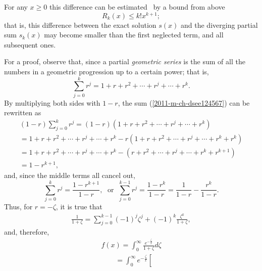For any $x\ge 0$ this difference can be estimated~\cite{rousseau-2004} by  a bound from above
\begin{equation}
  R_k(x)
\le
k! x^{k+1};
\label{2011-m-ch-dseeest}
\end{equation}
that is, this difference between the exact solution $s(x)$ and the diverging partial sum
$s_{k}(x)$ may become smaller than the first neglected term, and all subsequent ones.




{\color{OliveGreen}
\bproof

For a proof, observe that,
since
a partial {\em geometric series}
is the sum of all the numbers in a geometric progression up to a certain power;
that is,
\begin{equation}
\sum_{j=0}^k r^j =   1+r+r^2+ \cdots +r^j+ \cdots +r^k .
\label{2011-m-ch-dsee124567}
\end{equation}
By multiplying both sides with $1-r$,
the sum (\ref{2011-m-ch-dsee124567}) can be rewritten as
\begin{equation}
\begin{split}
(1-r) \sum_{j=0}^k r^j=
(1-r) (1+ r+r^2+ \cdots +r^j+ \cdots +r^k)\\
=1+ r+r^2+ \cdots +r^j+ \cdots +r^k -
r(1+r+r^2+ \cdots +r^j+ \cdots +r^k +r^k) \\
=1+ r+r^2+ \cdots +r^j+ \cdots +r^k -
(r+r^2+ \cdots +r^j+ \cdots +r^k +r^{k+1}) \\
= 1-r^{k+1}
,
\end{split}
\end{equation}
and, since the middle terms all cancel out,
\begin{equation}
\sum_{j=0}^k r^j =  \frac{1-r^{k+1}}{1-r},
\;
\textrm{ or }
\;
\sum_{j=0}^{k-1} r^j =  \frac{1-r^{k}}{1-r}  =  \frac{1}{1-r} - \frac{r^{k}}{1-r}
.
\label{2011-m-ch-dsee12}
\end{equation}
Thus, for $r=-\zeta$, it is true that
\begin{equation}
\begin{split}
\frac{1}{1+\zeta}=\sum_{j=0}^{k-1} (-1)^j \zeta^j + (-1)^k \frac{\zeta^k}{1+\zeta},
\end{split}
\label{2011-m-ch-dsee13}
\end{equation}
and, therefore,
\begin{equation}
\begin{split}
f(x) =\int_0^\infty \frac{e^{-\frac{\zeta}{x}}}{1+\zeta}d\zeta \\
\qquad =
\int_0^\infty  e^{-\frac{\zeta}{x}}\left[

\end{split}
\end{equation}}
